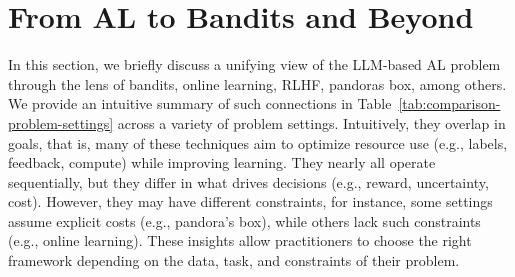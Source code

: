 \section{From AL to Bandits and Beyond}
\label{sec:unifying-settings}

In this section, we briefly discuss a unifying view of the LLM-based AL problem through the lens of bandits, online learning, RLHF, pandoras box, among others.
We provide an intuitive summary of such connections in Table~\ref{tab:comparison-problem-settings} across a variety of problem settings.
Intuitively, they overlap in goals, that is, 
many of these techniques aim to optimize resource use (e.g., labels, feedback, compute) while improving learning. 
They nearly all operate sequentially, but they differ in what drives decisions (e.g., reward, uncertainty, cost).
% 
However, they may have different constraints, for instance, 
some settings assume explicit costs (e.g., pandora's box), while others lack such constraints (e.g., online learning).
% 
These insights allow practitioners to choose the right framework depending on the data, task, and constraints of their problem.


\renewcommand{\arraystretch}{1.5} %

